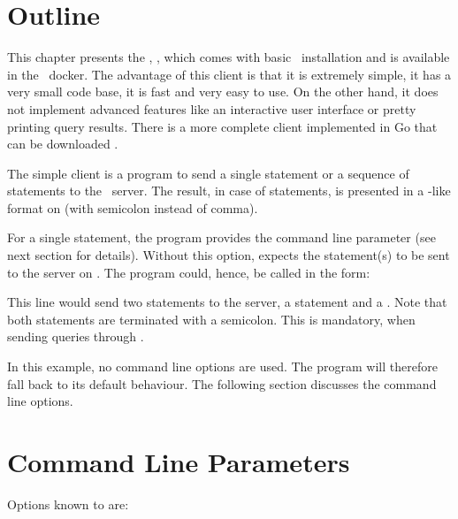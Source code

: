 \section{Outline}
This chapter presents the ,
,
which comes with basic \nowdb\ installation
and is available in the \nowdb\ docker.
The advantage of this client is that it is
extremely simple, it has a very small code base,
it is fast and very easy to use.
On the other hand, it does not implement
advanced features like an interactive user interface
or pretty printing query results.
There is a more complete client implemented
in Go  that can be downloaded
.

The simple client is a program to send a
single statement or a sequence of statements
to the \nowdb\ server. The result,
in case of  statements,
is presented in a -like format
on 
(with semicolon instead of comma).

For a single  statement,
the program provides the command line parameter
 (see next section for details).
Without this option, 
expects the statement(s) to be sent to the server
on . The program could, hence,
be called in the form:


This line would send two statements to the server,
a  statement and a .
Note that both statements are terminated with
a semicolon. This is mandatory, when sending
queries through .

In this example, no command line options are used.
The program will therefore fall back to
its default behaviour.
The following section discusses
the command line options.

\clearpage
\section{Command Line Parameters}
Options known to  are:

